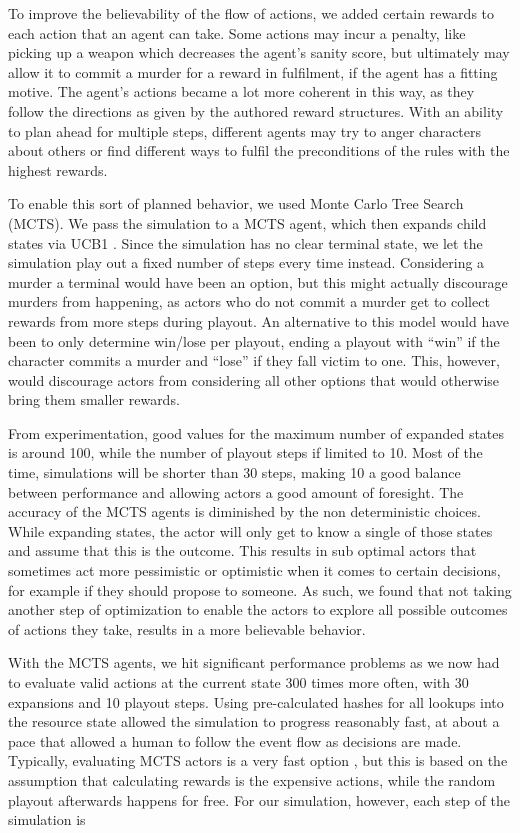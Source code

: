 To improve the believability of the flow of actions, we added certain rewards to each action that an agent can take. Some actions may incur a penalty, like picking up a weapon which decreases the agent's sanity score, but ultimately may allow it to commit a murder for a reward in fulfilment, if the agent has a fitting motive. The agent's actions became a lot more coherent in this way, as they follow the directions as given by the authored reward structures. With an ability to plan ahead for multiple steps, different agents may try to anger characters about others or find different ways to fulfil the preconditions of the rules with the highest rewards. 

To enable this sort of planned behavior, we used Monte Carlo Tree Search (MCTS). We pass the simulation to a MCTS agent, which then expands child states via UCB1 . Since the simulation has no clear terminal state, we let the simulation play out a fixed number of steps every time instead. Considering a murder a terminal would have been an option, but this might actually discourage murders from happening, as actors who do not commit a murder get to collect rewards from more steps during playout. An alternative to this model would have been to only determine win/lose per playout, ending a playout with \enquote{win} if the character commits a murder and \enquote{lose} if they fall victim to one. This, however, would discourage actors from considering all other options that would otherwise bring them smaller rewards.

From experimentation, good values for the maximum number of expanded states is around 100, while the number of playout steps if limited to 10. Most of the time, simulations will be shorter than 30 steps, making 10 a good balance between performance and allowing actors a good amount of foresight. The accuracy of the MCTS agents is diminished by the non deterministic choices. While expanding states, the actor will only get to know a single of those states and assume that this is the outcome. This results in sub optimal actors that sometimes act more pessimistic or optimistic when it comes to certain decisions, for example if they should propose to someone. As such, we found that not taking another step of optimization to enable the actors to explore all possible outcomes of actions they take, results in a more believable behavior.

With the MCTS agents, we hit significant performance problems as we now had to evaluate valid actions at the current state 300 times more often, with 30 expansions and 10 playout steps. Using pre-calculated hashes for all lookups into the resource state allowed the simulation to progress reasonably fast, at about a pace that allowed a human to follow the event flow as decisions are made. Typically, evaluating MCTS actors is a very fast option , but this is based on the assumption that calculating rewards is the expensive actions, while the random playout afterwards happens for free. For our simulation, however, each step of the simulation is 

